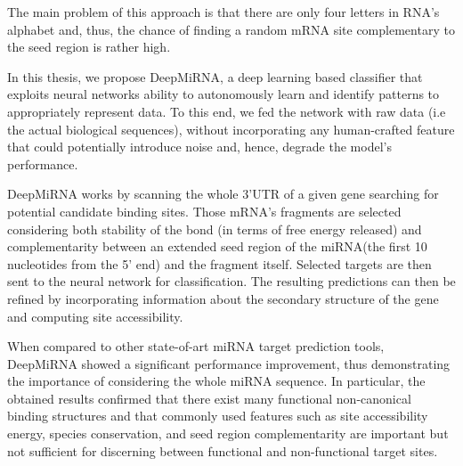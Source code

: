 The main problem of this approach is that there are only four letters in RNA's alphabet and, thus, the chance of finding a random mRNA site complementary to the seed region is rather high.

In this thesis, we propose DeepMiRNA, a deep learning based classifier that exploits neural networks ability to autonomously learn and identify patterns to appropriately represent data. To this end, we fed the network with raw data (i.e the actual biological sequences), without incorporating any human-crafted feature that could potentially introduce noise and, hence, degrade the model's performance. 

DeepMiRNA works by scanning the whole 3'UTR of a given gene searching for potential candidate binding sites. Those mRNA's fragments are selected considering both stability of the bond (in terms of free energy released) and complementarity between an extended seed region of the miRNA(the first 10 nucleotides from the 5' end)  and the fragment itself. Selected targets are then sent to the neural network for classification. The resulting predictions can then be refined by incorporating information about the secondary structure of the gene and computing site accessibility.

When compared to other state-of-art miRNA target prediction tools, DeepMiRNA showed a significant performance improvement, thus demonstrating the importance of considering the whole miRNA sequence.  In particular, the obtained results confirmed that there exist many functional non-canonical binding structures and that commonly used features such as site accessibility energy, species conservation, and seed region complementarity are important but not sufficient for discerning between functional and non-functional target sites.  